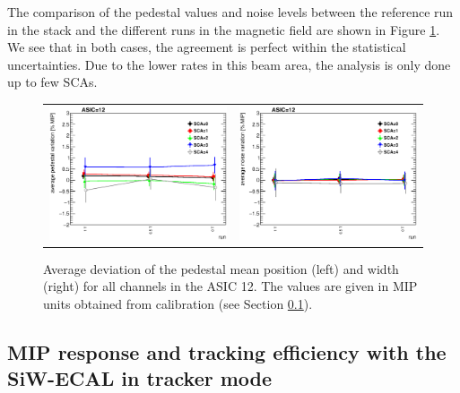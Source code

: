 \documentclass[a4paper,11pt]{article}
\begin{document}
The comparison of the pedestal values and noise levels between the reference run in the stack
and the different runs in the magnetic field are shown in Figure \ref{pedestal_magnetic}.
We see that in both cases, the agreement is perfect within the statistical uncertainties.
Due to the lower rates in this beam area, the
analysis is only done up to few SCAs.

\begin{figure}[!t]
  \centering
  \begin{tabular}{ll}
    \includegraphics[width=2.8in]{figs/pedestal/1T/summary_pedestal_chip12.eps} & \includegraphics[width=2.8in]{figs/pedestal/1T/summary_noise_chip12.eps}
  \end{tabular}
  \caption{Average deviation of the pedestal mean position (left) and width (right) for all channels in the ASIC 12. The values are given in MIP units obtained from calibration (see Section \ref{sec:mip}).}
\label{pedestal_magnetic}
\end{figure}

\subsection{MIP response and tracking efficiency with the SiW-ECAL in tracker mode}
\label{sec:mip}
\end{document}
